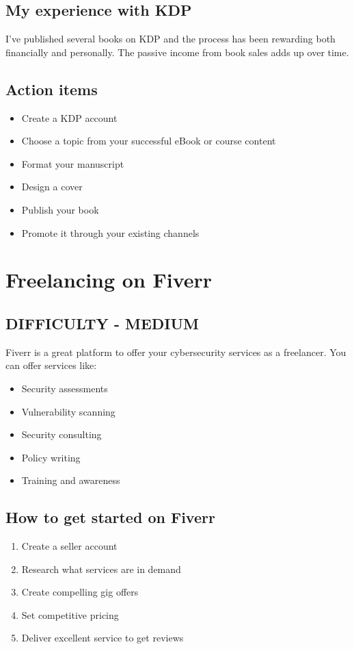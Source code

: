 \documentclass[11pt]{article}
\begin{document}
\subsection*{My experience with KDP}
I've published several books on KDP and the process has been rewarding both financially and personally. The passive income from book sales adds up over time.

\subsection*{Action items}
\begin{itemize}
\item Create a KDP account
\item Choose a topic from your successful eBook or course content
\item Format your manuscript
\item Design a cover
\item Publish your book
\item Promote it through your existing channels
\end{itemize}

\section*{Freelancing on Fiverr}
\subsection*{DIFFICULTY - MEDIUM}
Fiverr is a great platform to offer your cybersecurity services as a freelancer. You can offer services like:

\begin{itemize}
\item Security assessments
\item Vulnerability scanning
\item Security consulting
\item Policy writing
\item Training and awareness
\end{itemize}

\subsection*{How to get started on Fiverr}
\begin{enumerate}
\item Create a seller account
\item Research what services are in demand
\item Create compelling gig offers
\item Set competitive pricing
\item Deliver excellent service to get reviews
\end{enumerate}
\end{document}
